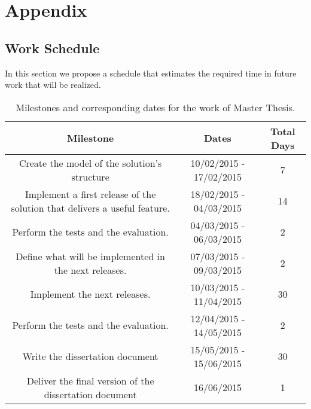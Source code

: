 \section{Appendix}
\label{sec:appendix}
\subsection{Work Schedule}
\label{sub:work_schedule}
In this section we propose a schedule that estimates the required time in future work that will be realized.
\begin{table}[h]
  \begin{tabular}{|c|c|c|}
    \hline
    \textbf{Milestone}                                                         & \textbf{Dates}          & \textbf{Total Days} \\ \hline
    Create the model of the solution's structure                                & 10/02/2015 - 17/02/2015  & 7          \\ \hline
    Implement a first release of the solution that delivers a useful feature.   & 18/02/2015 - 04/03/2015  & 14         \\ \hline
    Perform the tests and the evaluation.                                       & 04/03/2015 - 06/03/2015  & 2          \\ \hline
    Define what will be implemented in the next releases.                       & 07/03/2015 - 09/03/2015  & 2          \\ \hline
    Implement the next releases.                                                & 10/03/2015 - 11/04/2015  & 30         \\ \hline
    Perform the tests and the evaluation.                                       & 12/04/2015 - 14/05/2015  & 2          \\ \hline
    Write the dissertation document                                             & 15/05/2015 - 15/06/2015  & 30         \\ \hline
    Deliver the final version of the dissertation document                      & 16/06/2015               & 1          \\ \hline
  \end{tabular}
  \caption {Milestones and corresponding dates for the work of Master Thesis.}
\end{table}

